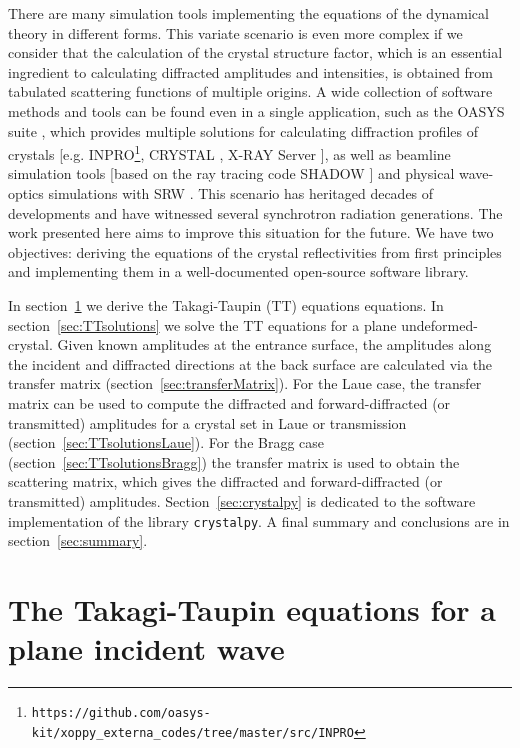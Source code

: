 \documentclass[preprint]{iucr}              %
\begin{document}
There are many simulation tools implementing the equations of the dynamical theory in different forms. This variate scenario is even more complex if we consider that the calculation of the crystal structure factor, which is an essential ingredient to calculating diffracted amplitudes and intensities, is obtained from tabulated scattering functions of multiple origins. A wide collection of software methods and tools can be found even in a single application, such as the OASYS suite \cite{codeOASYS}, which provides multiple solutions for calculating diffraction profiles of crystals [e.g. INPRO\footnote{\texttt{https://github.com/oasys-kit/xoppy\_externa\_codes/tree/master/src/INPRO}}, CRYSTAL \cite{codeCRYSTAL}, X-RAY Server \cite{codeXRAYserver}], as well as beamline simulation tools [based on the ray tracing code SHADOW \cite{codeSHADOW}] and physical wave-optics simulations with SRW \cite{codeSRW, codeSRWcrystals}. This scenario has heritaged decades of developments and have witnessed several synchrotron radiation generations. The work presented here aims to improve this situation for the future. We have two objectives: deriving the equations of the crystal reflectivities from first principles and implementing them in a well-documented open-source software library.

In section~\ref{sec:TT} we derive the Takagi-Taupin (TT) equations \cite{Takagi1962, Taupin, Taupin1967} equations.
In section~\ref{sec:TTsolutions} we solve the TT equations for a plane undeformed-crystal.
Given known amplitudes at the entrance surface, the amplitudes along the incident and diffracted directions at the back surface are calculated via the transfer matrix (section~\ref{sec:transferMatrix}). For the Laue case, the transfer matrix can be used to compute the diffracted and forward-diffracted (or transmitted) amplitudes for a crystal set in Laue or transmission (section~\ref{sec:TTsolutionsLaue}). For the Bragg case (section~\ref{sec:TTsolutionsBragg}) the transfer matrix is used to obtain the scattering matrix, which gives the diffracted and forward-diffracted (or transmitted) amplitudes. 
Section~\ref{sec:crystalpy} is dedicated to the software implementation of the library \texttt{crystalpy}. A final summary and conclusions are in section~\ref{sec:summary}.
 
%
\section{The Takagi-Taupin equations for a plane incident wave}
\label{sec:TT}
\end{document}
